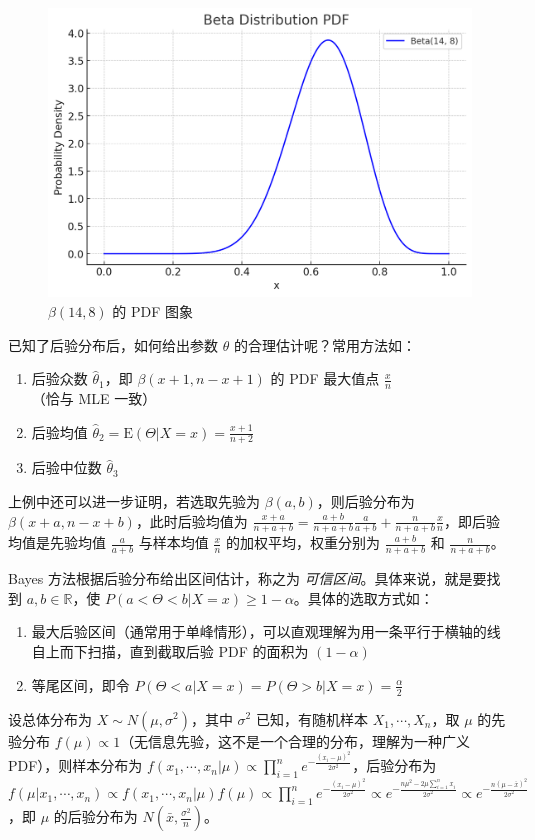 \documentclass[../main.tex]{subfiles}
\begin{document}
\begin{figure}[!h]
    \centering
    \includegraphics[scale=0.4]{figures/beta(14,8).png}
    \caption{$\beta(14,8)$ 的 PDF 图象}
    \label{fig:6.5.1}
\end{figure}

已知了后验分布后，如何给出参数 $\theta$ 的合理估计呢？常用方法如：
\begin{enumerate}
    \item 后验众数 $\hat\theta_1$，即 $\beta(x+1,n-x+1)$ 的 PDF 最大值点 $\frac xn$（恰与 MLE 一致）
    \item 后验均值 $\hat\theta_2=\mathrm E(\Theta|X=x)=\frac{x+1}{n+2}$
    \item 后验中位数 $\hat\theta_3$
\end{enumerate}

上例中还可以进一步证明，若选取先验为 $\beta(a,b)$，则后验分布为 $\beta(x+a,n-x+b)$，此时后验均值为 $\frac{x+a}{n+a+b}=\frac{a+b}{n+a+b}\frac{a}{a+b}+\frac{n}{n+a+b}\frac{x}{n}$，即后验均值是先验均值 $\frac a{a+b}$ 与样本均值 $\frac xn$ 的加权平均，权重分别为 $\frac{a+b}{n+a+b}$ 和 $\frac{n}{n+a+b}$。

Bayes 方法根据后验分布给出区间估计，称之为 \emph{可信区间}。具体来说，就是要找到 $a,b\in\mathbb R$，使 $P(a<\Theta<b|X=x)\geq1-\alpha$。具体的选取方式如：
\begin{enumerate}
    \item 最大后验区间（通常用于单峰情形），可以直观理解为用一条平行于横轴的线自上而下扫描，直到截取后验 PDF 的面积为 $(1-\alpha)$
    \item 等尾区间，即令 $P(\Theta<a|X=x)=P(\Theta>b|X=x)=\frac\alpha2$
\end{enumerate}

\begin{example}
    设总体分布为 $X\sim N(\mu,\sigma^2)$，其中 $\sigma^2$ 已知，有随机样本 $X_1,\cdots,X_n$，取 $\mu$ 的先验分布 $f(\mu)\propto 1$（无信息先验，这不是一个合理的分布，理解为一种广义 PDF），则样本分布为 $f(x_1,\cdots,x_n|\mu)\propto\prod_{i=1}^ne^{-\frac{(x_i-\mu)^2}{2\sigma^2}}$，后验分布为 $f(\mu|x_1,\cdots,x_n)\propto f(x_1,\cdots,x_n|\mu)f(\mu)\propto\prod_{i=1}^ne^{-\frac{(x_i-\mu)^2}{2\sigma^2}}\propto e^{-\frac{n\mu^2-2\mu\sum_{i=1}^nx_i}{2\sigma^2}}\propto e^{-\frac{n(\mu-\bar x)^2}{2\sigma^2}}$，即 $\mu$ 的后验分布为 $N(\bar x,\frac{\sigma^2}{n})$。
\end{example}
\end{document}
